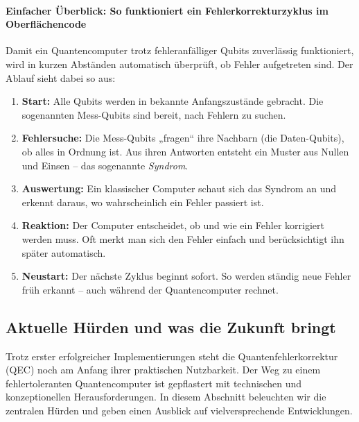 \paragraph{Einfacher Überblick: So funktioniert ein Fehlerkorrekturzyklus im Oberflächencode}Damit ein Quantencomputer trotz fehleranfälliger Qubits zuverlässig funktioniert, wird in kurzen Abständen automatisch überprüft, ob Fehler aufgetreten sind. Der Ablauf sieht dabei so aus:

\begin{enumerate}
  \item \textbf{Start:}  
  Alle Qubits werden in bekannte Anfangszustände gebracht. Die sogenannten Mess-Qubits sind bereit, nach Fehlern zu suchen.

  \item \textbf{Fehlersuche:}  
  Die Mess-Qubits „fragen“ ihre Nachbarn (die Daten-Qubits), ob alles in Ordnung ist. Aus ihren Antworten entsteht ein Muster aus Nullen und Einsen – das sogenannte \emph{Syndrom}.

  \item \textbf{Auswertung:}  
  Ein klassischer Computer schaut sich das Syndrom an und erkennt daraus, wo wahrscheinlich ein Fehler passiert ist.

  \item \textbf{Reaktion:}  
  Der Computer entscheidet, ob und wie ein Fehler korrigiert werden muss. Oft merkt man sich den Fehler einfach und berücksichtigt ihn später automatisch.

  \item \textbf{Neustart:}  
  Der nächste Zyklus beginnt sofort. So werden ständig neue Fehler früh erkannt – auch während der Quantencomputer rechnet.
\end{enumerate}

\subsection{Aktuelle H\"urden und was die Zukunft bringt}\label{chap:QEC3.3}

Trotz erster erfolgreicher Implementierungen steht die Quantenfehlerkorrektur (QEC) noch am Anfang ihrer praktischen Nutzbarkeit. Der Weg zu einem fehlertoleranten Quantencomputer ist gepflastert mit technischen und konzeptionellen Herausforderungen. In diesem Abschnitt beleuchten wir die zentralen H\"urden und geben einen Ausblick auf vielversprechende Entwicklungen.


